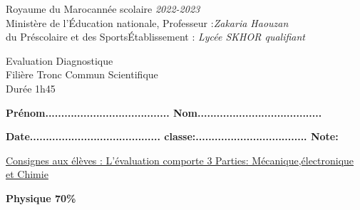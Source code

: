 \documentclass[12pt]{article}
\newcommand\headerMe[2]{\noindent{}#1\hfill#2}
\begin{document}
\headerMe{Royaume du Maroc}{année scolaire \emph{2022-2023}}\\
\headerMe{Ministère de l'Éducation nationale, }{  Professeur :\emph{Zakaria Haouzan}}\\
\headerMe{du Préscolaire et des Sports}{Établissement : \emph{Lycée SKHOR qualifiant}}\\
\begin{center}
	\vspace{-0.8cm}
Evaluation Diagnostique \\
Filière Tronc Commun Scientifique\\
Durée 1h45
\\
\end{center}
\begin{center}
	\vspace{-0.2cm}
	\textbf{ Prénom.......................................  Nom.......................................}
	
	\vspace{0.2cm}
	\textbf{ Date.........................................  classe:................................... Note: }
		
\end{center}
\begin{center}

	\vspace{-0.55cm}
\underline{Consignes aux élèves : L’évaluation comporte 3 Parties: Mécanique,électronique et Chimie}

	\hrulefill
\textbf{Physique 70\%}
\hrulefill
\end{center}
\end{document}
